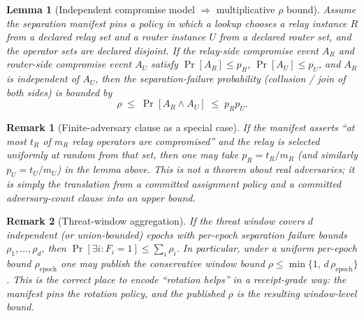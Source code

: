 \documentclass[11pt]{article}
\newtheorem{lemma}{Lemma}
\newtheorem{remark}{Remark}
\begin{document}
\begin{lemma}[Independent compromise model $\Rightarrow$ multiplicative $\rho$ bound]
Assume the separation manifest pins a policy in which a lookup chooses a relay instance $R$ from a declared relay set and a router instance $U$ from a declared router set, and the operator sets are declared disjoint.
If the relay-side compromise event $A_R$ and router-side compromise event $A_U$ satisfy
\(\Pr[A_R]\le p_R\), \(\Pr[A_U]\le p_U\), and \(A_R\) is independent of \(A_U\),
then the separation-failure probability (collusion / join of both sides) is bounded by
\[\rho \;\le\; \Pr[A_R\wedge A_U] \;\le\; p_R p_U.
\]
\end{lemma}

\begin{remark}[Finite-adversary clause as a special case]
If the manifest asserts ``at most $t_R$ of $m_R$ relay operators are compromised'' and the relay is selected uniformly at random from that set, then one may take $p_R=t_R/m_R$ (and similarly $p_U=t_U/m_U$) in the lemma above.
This is not a theorem about real adversaries; it is simply the translation from a committed assignment policy and a committed adversary-count clause into an upper bound.
\end{remark}

\begin{remark}[Threat-window aggregation]
If the threat window covers $d$ independent (or union-bounded) epochs with per-epoch separation failure bounds $\rho_1,\dots,\rho_d$, then
\(\Pr[\exists i: F_i=1] \le \sum_i \rho_i\).
In particular, under a uniform per-epoch bound $\rho_\mathrm{epoch}$ one may publish the conservative window bound $\rho\le \min\{1,\,d\,\rho_\mathrm{epoch}\}$.
This is the correct place to encode ``rotation helps'' in a receipt-grade way: the manifest pins the rotation policy, and the published $\rho$ is the resulting window-level bound.
\end{remark}
\end{document}
